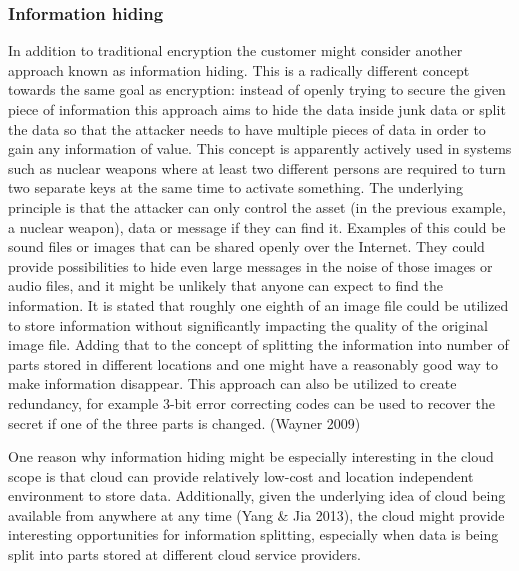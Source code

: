 \documentclass{article}
\begin{document}
\subsubsection{Information hiding}
In addition to traditional encryption the customer might consider another approach known as information hiding. This is a radically different concept towards the same goal as encryption: instead of openly trying to secure the given piece of information this approach aims to hide the data inside junk data or split the data so that the attacker needs to have multiple pieces of data in order to gain any information of value. This concept is apparently actively used in systems such as nuclear weapons where at least two different persons are required to turn two separate keys at the same time to activate something. The underlying principle is that the attacker can only control the asset (in the previous example, a nuclear weapon), data or message if they can find it. Examples of this could be sound files or images that can be shared openly over the Internet. They could provide possibilities to hide even large messages in the noise of those images or audio files, and it might be unlikely that anyone can expect to find the information. It is stated that roughly one eighth of an image file could be utilized to store information without significantly impacting the quality of the original image file. Adding that to the concept of splitting the information into number of parts stored in different locations and one might have a reasonably good way to make information disappear. This approach can also be utilized to create redundancy, for example 3-bit error correcting codes can be used to recover the secret if one of the three parts is changed. (Wayner 2009)
\par
One reason why information hiding might be especially interesting in the cloud scope is that cloud can provide relatively low-cost and location independent environment to store data. Additionally, given the underlying idea of cloud being available from anywhere at any time (Yang \& Jia 2013), the cloud might provide interesting opportunities for information splitting, especially when data is being split into parts stored at different cloud service providers.
\end{document}
